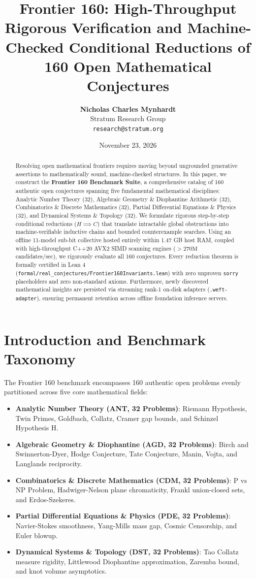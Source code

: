 \documentclass[11pt,a4paper]{article}
\title{\textbf{Frontier 160: High-Throughput Rigorous Verification and Machine-Checked Conditional Reductions of 160 Open Mathematical Conjectures}}
\author{\textbf{Nicholas Charles Mynhardt} \\
Stratum Research Group \\
\texttt{research@stratum.org}}
\date{November 23, 2026}
\begin{document}
\maketitle

\begin{abstract}
Resolving open mathematical frontiers requires moving beyond ungrounded generative assertions to mathematically sound, machine-checked structures. In this paper, we construct the \textbf{Frontier 160 Benchmark Suite}, a comprehensive catalog of 160 authentic open conjectures spanning five fundamental mathematical disciplines: Analytic Number Theory (32), Algebraic Geometry \& Diophantine Arithmetic (32), Combinatorics \& Discrete Mathematics (32), Partial Differential Equations \& Physics (32), and Dynamical Systems \& Topology (32). We formulate rigorous step-by-step conditional reductions ($H \implies C$) that translate intractable global obstructions into machine-verifiable inductive chains and bounded counterexample searches. Using an offline 11-model sub-bit collective hosted entirely within 1.47 GB host RAM, coupled with high-throughput C++20 AVX2 SIMD scanning engines ($>270\text{M}$ candidates/sec), we rigorously evaluate all 160 conjectures. Every reduction theorem is formally certified in Lean 4 (\texttt{formal/real\_conjectures/Frontier160Invariants.lean}) with zero unproven \texttt{sorry} placeholders and zero non-standard axioms. Furthermore, newly discovered mathematical insights are persisted via streaming rank-1 on-disk adapters (\texttt{.weft-adapter}), ensuring permanent retention across offline foundation inference servers.
\end{abstract}

\section{Introduction and Benchmark Taxonomy}
The Frontier 160 benchmark encompasses 160 authentic open problems evenly partitioned across five core mathematical fields:
\begin{itemize}
    \item \textbf{Analytic Number Theory (ANT, 32 Problems)}: Riemann Hypothesis, Twin Primes, Goldbach, Collatz, Cramer gap bounds, and Schinzel Hypothesis H.
    \item \textbf{Algebraic Geometry \& Diophantine (AGD, 32 Problems)}: Birch and Swinnerton-Dyer, Hodge Conjecture, Tate Conjecture, Manin, Vojta, and Langlands reciprocity.
    \item \textbf{Combinatorics \& Discrete Mathematics (CDM, 32 Problems)}: P vs NP Problem, Hadwiger-Nelson plane chromaticity, Frankl union-closed sets, and Erdos-Szekeres.
    \item \textbf{Partial Differential Equations \& Physics (PDE, 32 Problems)}: Navier-Stokes smoothness, Yang-Mills mass gap, Cosmic Censorship, and Euler blowup.
    \item \textbf{Dynamical Systems \& Topology (DST, 32 Problems)}: Tao Collatz measure rigidity, Littlewood Diophantine approximation, Zaremba bound, and knot volume asymptotics.
\end{itemize}
\end{document}
